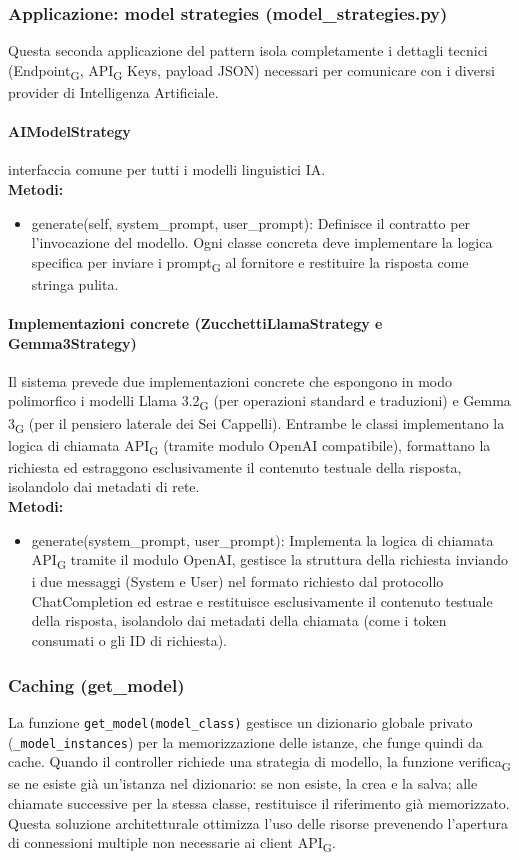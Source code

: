 \documentclass[11pt,a4paper]{article}
\newcommand{\gls}[1]{#1\textsubscript{G}}
\begin{document}
\subsubsection{Applicazione: model strategies
(model\_strategies.py)}
Questa seconda applicazione del pattern isola completamente i dettagli tecnici (\gls{Endpoint}, \gls{API} Keys, payload JSON) necessari per comunicare con i diversi provider di Intelligenza Artificiale.

\paragraph{AIModelStrategy} interfaccia comune per tutti i modelli linguistici IA.
\\ \textbf{Metodi:}
\begin{itemize}
    \item generate(self, system\_prompt, user\_prompt): Definisce il contratto per l'invocazione del modello. Ogni classe concreta deve implementare la logica specifica per inviare i \gls{prompt} al fornitore e restituire la risposta come stringa pulita.
\end{itemize}

\paragraph{Implementazioni concrete (ZucchettiLlamaStrategy e Gemma3Strategy)}
Il sistema prevede due implementazioni concrete che espongono in modo polimorfico i modelli \gls{Llama 3.2} (per operazioni standard e traduzioni) e \gls{Gemma 3} (per il pensiero laterale dei Sei Cappelli).
Entrambe le classi implementano la logica di chiamata \gls{API} (tramite modulo OpenAI compatibile), formattano la richiesta ed estraggono esclusivamente il contenuto testuale della risposta, isolandolo dai metadati di rete.\\
\textbf{Metodi:}
\begin{itemize}
    \item generate(system\_prompt, user\_prompt): Implementa la logica di chiamata \gls{API} tramite il modulo OpenAI, gestisce la struttura della richiesta inviando i due messaggi (System e User) nel formato richiesto dal protocollo ChatCompletion ed estrae e restituisce esclusivamente il contenuto testuale della risposta, isolandolo dai metadati della chiamata (come i token consumati o gli ID di richiesta).
\end{itemize}

\subsubsection{Caching (get\_model)}
La funzione \texttt{get\_model(model\_class)} gestisce un dizionario globale privato (\texttt{\_model\_instances}) per la memorizzazione delle istanze, che funge quindi da cache.
Quando il controller richiede una strategia di modello, la funzione \gls{verifica} se ne esiste già un'istanza nel dizionario: se non esiste, la crea e la salva; alle chiamate successive per la stessa classe, restituisce il riferimento già memorizzato. 
Questa soluzione architetturale ottimizza l'uso delle risorse prevenendo l'apertura di connessioni multiple non necessarie ai client \gls{API}.
\end{document}
